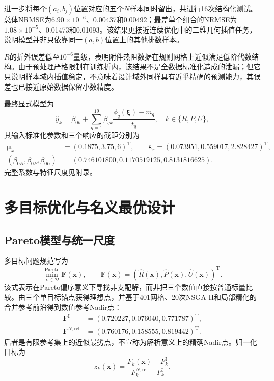 \documentclass[UTF8,12pt,a4paper]{ctexart}
\begin{document}
进一步将每个$(a_i,b_j)$位置对应的五个$N$样本同时留出，共进行16次结构化测试。总体NRMSE为$6.90\times10^{-6}$、0.00437和0.00492；最差单个组合的NRMSE为$1.08\times10^{-5}$、0.01473和0.01093。该结果更接近连续优化中的二维几何插值任务，说明模型并非只依靠同一$(a,b)$位置上的其他排数样本。

$R$的折外误差低至$10^{-6}$量级，表明附件热阻数据在规则网格上近似满足低阶代数结构。由于预处理严格限制在训练折内，该结果不是全数据标准化造成的泄漏；但它只说明样本域内插值稳定，不意味着设计域外同样具有近乎精确的预测能力，其误差也已接近原始数据保留小数精度。

最终显式模型为
\begin{equation}
\widehat y_k=\beta_{0k}+\sum_{q=1}^{19}\beta_{qk}
\frac{\phi_q(\bm\xi)-m_q}{t_q},
\quad k\in\{R,P,U\},
\end{equation}
其输入标准化参数和三个响应的截距分别为
\begin{align}
\bm\mu_x&=(0.1875,3.75,6)^{\mathrm T},\qquad
\bm s_x=(0.073951,0.559017,2.828427)^{\mathrm T},\\
(\beta_{0R},\beta_{0P},\beta_{0U})
&=(0.746101800,0.1170519125,0.8131816625).
\end{align}
完整系数与特征尺度见附录。

\section{多目标优化与名义最优设计}

\subsection{Pareto模型与统一尺度}
多目标问题规范写为
\begin{equation}
\min_{\bm x\in\mathcal D}^{\mathrm{Pareto}}\bm F(\bm x),\qquad
\bm F(\bm x)=\left(\widehat R(\bm x),\widehat P(\bm x),\widehat U(\bm x)\right)^{\mathrm T}.
\end{equation}
该式表示在Pareto偏序意义下寻找非支配解，而非把三个数值直接按普通标量比较。由三个单目标锚点获得理想点，并基于401网格、20次NSGA-II和局部精化的合并参考前沿得到数值参考Nadir点：
\begin{align}
\bm F^{\mathrm I}&=(0.720227,0.076040,0.771787)^{\mathrm T},\\
\bm F^{N,\mathrm{ref}}&=(0.760176,0.158555,0.819442)^{\mathrm T}.
\end{align}
后者是有限参考集上的近似最劣点，不宣称为解析意义上的精确Nadir点。归一化目标为
\begin{equation}
z_k(\bm x)=\frac{F_k(\bm x)-F_k^{\mathrm I}}
{F_k^{N,\mathrm{ref}}-F_k^{\mathrm I}}.
\end{equation}
\end{document}
